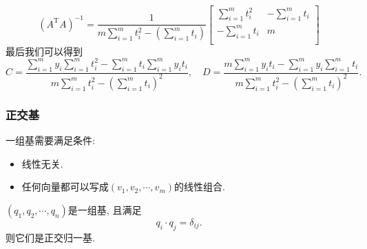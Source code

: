 \begin{equation}
  \left( A^{\mathrm{T}}A \right) ^{-1}
  =
  \frac{1}{m \sum_{i=1}^{m} t_i^{2} - \left( \sum_{i=1}^{m} t_i \right) } \begin{bmatrix}
   \sum_{i=1}^{m} t_i^{2} & -\sum_{i=1}^{m} t_i\\
   -\sum_{i=1}^{m} t_i & m\\
  \end{bmatrix}
\end{equation}
最后我们可以得到
\begin{equation}
  C = \frac{\sum_{i=1}^{m} y_i \sum_{i=1}^{m} t_i^{2} - \sum_{i=1}^{m} t_i \sum_{i=1}^{m} y_i t_i}{m \sum_{i=1}^{m} t_i^{2} - \left( \sum_{i=1}^{m} t_i \right) ^{2}}
  ,\quad
  D = \frac{m\sum_{i=1}^{m} y_i t_i - \sum_{i=1}^{m} y_i \sum_{i=1}^{m} t_i}{m \sum_{i=1}^{m} t_i^{2} - \left( \sum_{i=1}^{m} t_i \right) ^{2}}.
\end{equation}

\subsubsection{正交基}
一组基需要满足条件:
\begin{itemize}
    \item 线性无关.
    \item 任何向量都可以写成$\left( v_1,v_2,\cdots,v_m \right) $的线性组合.
\end{itemize}

\begin{definition}
    $\left( q_1,q_2,\cdots,q_n \right) $是一组基, 且满足
    \begin{equation}
      q_i \cdot q_j = \delta_{ij}.
    \end{equation}
    则它们是正交归一基.
\end{definition}

